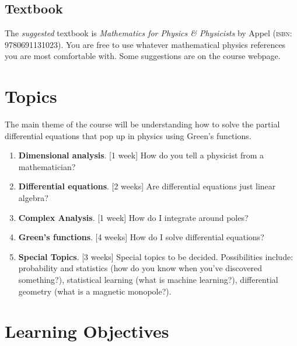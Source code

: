 \documentclass[12pt]{article}
\numberwithin{equation}{section}    %
\begin{document}
\subsection*{Textbook}

The \emph{suggested} textbook is \emph{Mathematics for Physics \& Physicists} by Appel (\textsc{isbn}: 9780691131023). You are free to use whatever mathematical physics references you are most comfortable with. Some suggestions are on the course webpage.

\section*{Topics}

The main theme of the course will be understanding how to solve the partial differential equations that pop up in physics using Green's functions. 

\begin{enumerate}
	\item \textbf{Dimensional analysis}. [1 week] How do you tell a physicist from a mathematician?
	\item \textbf{Differential equations}. [2 weeks] Are differential equations just linear algebra?
	\item \textbf{Complex Analysis}. [1 week] How do I integrate around poles?
	\item \textbf{Green's functions}. [4 weeks] How do I solve differential equations? %
	\item \textbf{Special Topics}. [3 weeks]  Special topics to be decided. Possibilities include: probability and statistics (how do you know when you've discovered something?), statistical learning (what is machine learning?), differential geometry (what is a magnetic monopole?).
\end{enumerate}

\section*{Learning Objectives}
\end{document}
